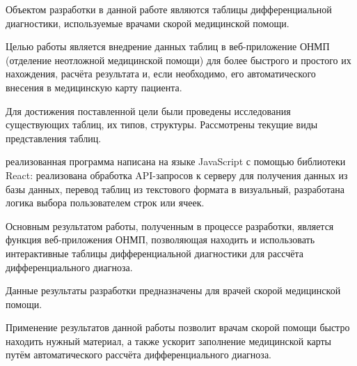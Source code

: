 \abstract %


Объектом разработки в данной работе являются таблицы дифференциальной диагностики, используемые врачами скорой медицинской помощи. 

Целью работы является внедрение данных таблиц в веб-приложение ОНМП (отделение неотложной медицинской помощи) для более быстрого и простого их нахождения, расчёта результата и, если необходимо, его автоматического внесения в медицинскую карту пациента.

Для достижения поставленной цели были проведены исследования существующих таблиц, их типов, структуры. Рассмотрены текущие виды представления таблиц. 

реализованная программа написана на языке JavaScript с помощью библиотеки React: реализована обработка API-запросов к серверу для получения данных из базы данных, перевод таблиц из текстового формата в визуальный, разработана логика выбора пользователем строк или ячеек.

Основным результатом работы, полученным в процессе разработки, является функция веб-приложения ОНМП, позволяющая находить и использовать интерактивные таблицы дифференциальной диагностики для рассчёта дифференциального диагноза. 

Данные результаты разработки предназначены для врачей скорой медицинской помощи.

Применение результатов данной работы позволит врачам скорой помощи быстро находить нужный материал, а также ускорит заполнение медицинской карты путём автоматического рассчёта дифференциального диагноза.

